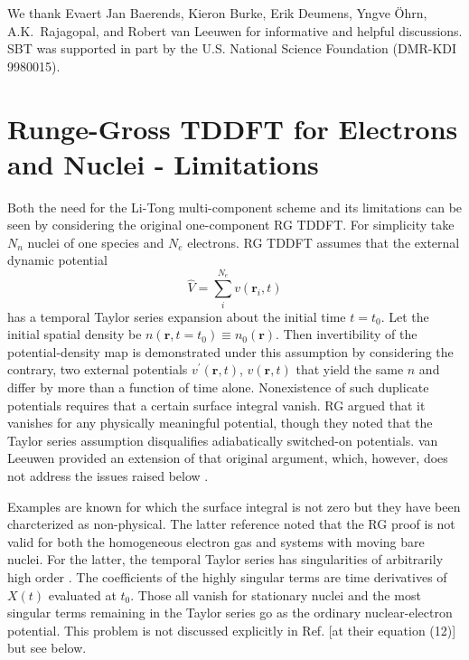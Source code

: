 \documentclass[aps,preprint]{revtex4}%
\begin{document}
We thank Evaert Jan Baerends, Kieron Burke, Erik Deumens, Yngve \"{O}hrn,
A.K.~Rajagopal, and Robert van Leeuwen for informative and helpful
discussions. SBT was supported in part by the U.S. National Science Foundation
(DMR-KDI 9980015).

\appendix


\section{Runge-Gross TDDFT for Electrons and Nuclei - Limitations}

\noindent Both the need for the Li-Tong multi-component scheme and its
limitations can be seen by considering the original one-component RG TDDFT.
For simplicity take $N_{n}$ nuclei of one species and $N_{e}$ electrons. RG
TDDFT assumes that the external dynamic potential
\begin{equation}
\hat V = \sum_{i}^{N_{e}} v(\mathbf{r}_{i},t) \label{VextofT}%
\end{equation}
has a temporal Taylor series expansion about the initial time $t=t_{0}$. Let
the initial spatial density be $n(\mathbf{r}, t=t_{0}) \equiv n_{0}%
(\mathbf{r})$. Then invertibility of the potential-density map is demonstrated
under this assumption by considering the contrary, two external potentials
$v^{\prime}(\mathbf{r},t)$, $v(\mathbf{r},t)$ that yield the same $n$ and
differ by more than a function of time alone. Nonexistence of such duplicate
potentials requires that a certain surface integral vanish. RG argued that it
vanishes for any physically meaningful potential, though they noted that the
Taylor series assumption disqualifies adiabatically switched-on potentials.
van Leeuwen provided an extension of that original argument, which, however,
does not address the issues raised below \cite{Leeuwen99}.

Examples are known for which the surface integral is not zero \cite{Xu85} but
they have been charcterized as non-physical\cite{Dhara87}. The latter
reference noted that the RG proof is not valid for both the homogeneous
electron gas \cite{HEGexample} and systems with moving bare nuclei. For the
latter, the temporal Taylor series has singularities of arbitrarily high order
\cite{bareTaylor}. The coefficients of the highly singular terms are time
derivatives of $X(t)$ evaluated at $t_{0}$. Those all vanish for stationary
nuclei and the most singular terms remaining in the Taylor series go as the
ordinary nuclear-electron potential. This problem is not discussed explicitly
in Ref. \cite{Saalmann96} [at their equation (12)] but see below.
\end{document}
